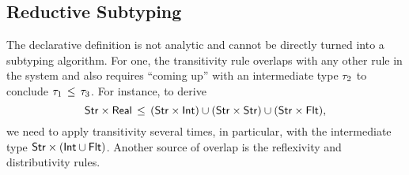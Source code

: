 \subsection{Reductive Subtyping}\label{sec:redsub}

The declarative definition is not analytic
and cannot be directly turned into a subtyping algorithm.
For one, the transitivity rule  
overlaps with any other rule in the system
and also requires ``coming up'' with an intermediate type $\tau_2$
to conclude $\tau_1 \, \leq \, \tau_3$.
For instance, to derive %
\[\mathsf{Str} \times \mathsf{Real} \, \leq \, (\mathsf{Str} \times \mathsf{Int}) \cup (\mathsf{Str} \times \mathsf{Str}) 
	\cup (\mathsf{Str} \times \mathsf{Flt}),\]
we need to apply transitivity several times, in particular, 
with the intermediate type $\mathsf{Str} \times (\mathsf{Int} \cup \mathsf{Flt})$.
Another source of overlap is the reflexivity and distributivity rules.

